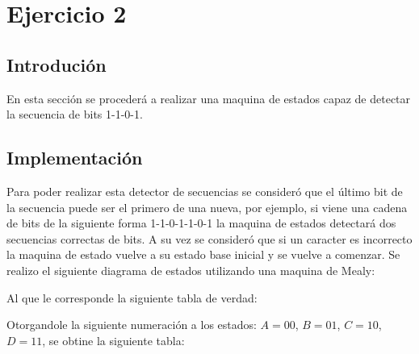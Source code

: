 



\section{Ejercicio 2}
\subsection{Introdución}
En esta sección se procederá a realizar una maquina de estados capaz de detectar la secuencia de bits 1-1-0-1.

\subsection{Implementación} 
Para poder realizar esta detector de secuencias se consideró que el último bit de la secuencia puede ser el primero de una nueva, por ejemplo, si viene una cadena de bits de la siguiente forma 1-1-0-1-1-0-1 la maquina de estados detectará dos secuencias correctas de bits. A su vez se consideró que si un caracter es incorrecto la maquina de estado vuelve a su estado base inicial y se vuelve a comenzar. Se realizo el siguiente diagrama de estados utilizando una maquina de Mealy:
\begin{figure}

\end{figure}
Al que le corresponde la siguiente tabla de verdad:


Otorgandole la siguiente numeración a los estados: $A=00$, $B=01$, $C=10$, $D=11$, se obtine la siguiente tabla:

